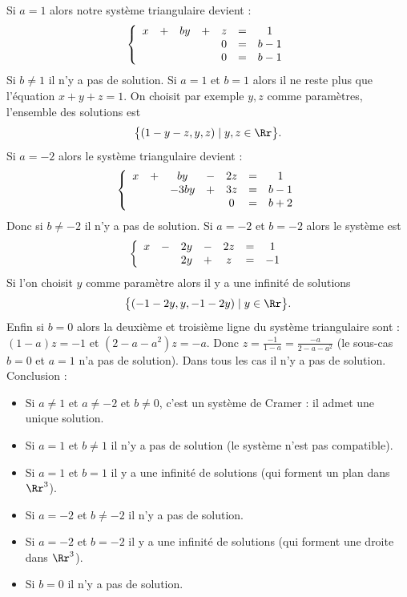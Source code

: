 {{Si $a=1$ alors notre système triangulaire devient :
$$\left\{\begin{array}{ccccccc}
x &+&  by &+&z&=& 1 \cr
  & & & &  0 &=& b-1 \cr
  &&   &&  0 &=& b-1 \cr
\end{array}\right.
$$ 
Si $b\neq 1$ il n'y a pas de solution.
Si $a=1$ et $b=1$
alors il ne reste plus que l'équation $x+y+z=1$.
On choisit par exemple $y,z$ comme paramètres, l'ensemble des solutions 
est $$\big\{(1-y-z,y,z) \mid y,z \in \Rr \big\}.$$
Si $a=-2$ alors le système triangulaire devient :
$$\left\{\begin{array}{ccccccc}
x &+&  by &-& 2z &=& 1 \cr
  & & -3by &+&  3z &=& b-1 \cr
  &&   &&  0 &=& b+2 \cr
\end{array}\right.
$$
Donc si $b\neq -2$ il n'y a pas de solution. 
Si $a=-2$ et $b=-2$ alors le système est
$$\left\{\begin{array}{ccccccc}
x &-&  2y &-& 2z &=& 1 \cr
  & & 2y &+&  z &=& -1 \cr
\end{array}\right.
$$
Si l'on choisit $y$ comme paramètre alors il y a une infinité de solutions
$$\big\{(-1-2y,y,-1-2y) \mid y \in \Rr \big\}.$$
Enfin si $b=0$
alors la deuxième et troisième ligne du système triangulaire sont :
$(1-a)z =-1 $ et $(2-a-a^2)z =-a$. Donc $z=\frac{-1}{1-a}=\frac{-a}{2-a-a^2}$
(le sous-cas $b=0$ et $a=1$ n'a pas de solution).
Dans tous les cas il n'y a pas de solution.
Conclusion :
\begin{itemize}
\item Si $a\neq 1$ et $a\neq -2$ et $b\neq 0$, c'est un système de Cramer : il admet une unique solution.
\item Si $a=1$ et $b\neq 1$ il n'y a pas de solution (le système n'est pas compatible).
\item Si $a=1$ et $b=1$ il y a une infinité de solutions (qui forment un plan dans $\Rr^3$).
\item Si $a=-2$ et $b\neq -2$ il n'y a pas de solution.
\item Si $a=-2$ et $b=-2$ il y a une infinité de solutions (qui forment une droite dans $\Rr^3$).
\item Si $b=0$ il n'y a pas de solution.
\end{itemize}
}
}
